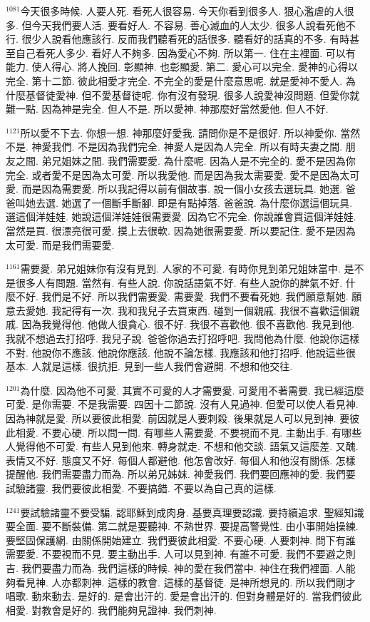 \documentclass{book}
\begin{document}
$^{1081}$今天很多時候.
人要人死.
看死人很容易.
今天你看到很多人.
狠心濫虐的人很多.
但今天我們要人活.
要看好人.
不容易.
善心滅血的人太少.
很多人說看死他不行.
很少人說看他應該行.
反而我們聽看死的話很多.
聽看好的話真的不多.
有時甚至自己看死人多少.
看好人不夠多.
因為愛心不夠.
所以第一.
住在主裡面.
可以有能力.
使人得心.
將人挽回.
彰顯神.
也彰顯愛.
第二.
愛心可以完全.
愛神的心得以完全.
第十二節.
彼此相愛才完全.
不完全的愛是什麼意思呢.
就是愛神不愛人.
為什麼基督徒愛神.
但不愛基督徒呢.
你有沒有發現.
很多人說愛神沒問題.
但愛你就難一點.
因為神是完全.
但人不是.
所以愛神.
神那麼好當然愛他.
但人不好.

$^{1121}$所以愛不下去.
你想一想.
神那麼好愛我.
請問你是不是很好.
所以神愛你.
當然不是.
神愛我們.
不是因為我們完全.
神愛人是因為人完全.
所以有時夫妻之間.
朋友之間.
弟兄姐妹之間.
我們需要愛.
為什麼呢.
因為人是不完全的.
愛不是因為你完全.
或者愛不是因為太可愛.
所以我愛他.
而是因為我太需要愛.
愛不是因為太可愛.
而是因為需要愛.
所以我記得以前有個故事.
說一個小女孩去選玩具.
她選.
爸爸叫她去選.
她選了一個斷手斷腳.
即是有點掉落.
爸爸說.
為什麼你選這個玩具.
選這個洋娃娃.
她說這個洋娃娃很需要愛.
因為它不完全.
你說誰會買這個洋娃娃.
當然是買.
很漂亮很可愛.
摸上去很軟.
因為她很需要愛.
所以要記住.
愛不是因為太可愛.
而是我們需要愛.

$^{1161}$需要愛.
弟兄姐妹你有沒有見到.
人家的不可愛.
有時你見到弟兄姐妹當中.
是不是很多人有問題.
當然有.
有些人說.
你說話語氣不好.
有些人說你的脾氣不好.
什麼不好.
我們是不好.
所以我們需要愛.
需要愛.
我們不要看死她.
我們願意幫她.
願意去愛她.
我記得有一次.
我和我兒子去買東西.
碰到一個親戚.
我很不喜歡這個親戚.
因為我覺得他.
他做人很貪心.
很不好.
我很不喜歡他.
很不喜歡他.
我見到他.
我就不想過去打招呼.
我兒子說.
爸爸你過去打招呼吧.
我問他為什麼.
他說你這樣不對.
他說你不應該.
他說你應該.
他說不論怎樣.
我應該和他打招呼.
他說這些很基本.
人就是這樣.
很抗拒.
見到一些人我們會避開.
不想和他交往.

$^{1201}$為什麼.
因為他不可愛.
其實不可愛的人才需要愛.
可愛用不著需要.
我已經這麼可愛.
是你需要.
不是我需要.
四因十二節說.
沒有人見過神.
但愛可以使人看見神.
因為神就是愛.
所以要彼此相愛.
前因就是人要刺殺.
後果就是人可以見到神.
要彼此相愛.
不要心硬.
所以問一問.
有哪些人需要愛.
不要視而不見.
主動出手.
有哪些人覺得他不可愛.
有些人見到他來.
轉身就走.
不想和他交談.
語氣又這麼差.
又醜.
表情又不好.
態度又不好.
每個人都避他.
他怎會改好.
每個人和他沒有關係.
怎樣提醒他.
我們需要盡力而為.
所以弟兄姊妹.
神愛我們.
我們要回應神的愛.
我們要試驗諸靈.
我們要彼此相愛.
不要搞錯.
不要以為自己真的這樣.

$^{1241}$要試驗諸靈不要受騙.
認耶穌到成肉身.
基要真理要認識.
要持續追求.
聖經知識要全面.
要不斷裝備.
第二就是要聽神.
不熟世界.
要提高警覺性.
由小事開始操練.
要堅固保護網.
由關係開始建立.
我們要彼此相愛.
不要心硬.
人要刺神.
問下有誰需要愛.
不要視而不見.
要主動出手.
人可以見到神.
有誰不可愛.
我們不要避之則吉.
我們要盡力而為.
我們這樣的時候.
神的愛在我們當中.
神住在我們裡面.
人能夠看見神.
人亦都刺神.
這樣的教會.
這樣的基督徒.
是神所想見的.
所以我們剛才唱歌.
動來動去.
是好的.
是會出汗的.
愛是會出汗的.
但對身體是好的.
當我們彼此相愛.
對教會是好的.
我們能夠見證神.
我們刺神.
\end{document}
